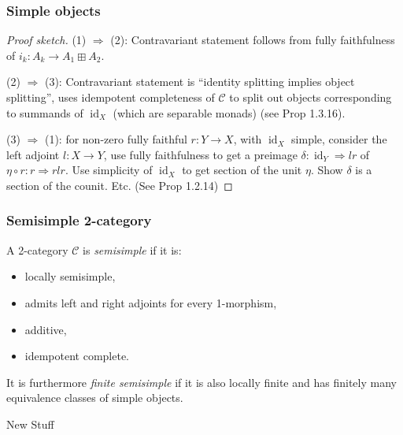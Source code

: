 \documentclass{beamer}
\DeclareMathOperator{\id}{id}
\newcommand{\cC}{{\mathcal{C}}}
\begin{document}
\begin{frame}
\frametitle{Simple objects}

\begin{proof}[Proof sketch]
(1) $\Rightarrow$ (2): Contravariant statement
follows from fully faithfulness of
$i_k: A_k \to A_1 \boxplus A_2$.

\pause

(2) $\Rightarrow$ (3): Contravariant statement is
``identity splitting implies object splitting'',
uses idempotent completeness of $\cC$
to split out objects corresponding to summands of $\id_X$
(which are separable monads)
(see \cite{DRfusion}{Prop 1.3.16}).

\pause

(3) $\Rightarrow$ (1): for non-zero fully faithful $r: Y \to X$,
with $\id_X$ simple,
consider the left adjoint $l: X \to Y$,
use fully faithfulness to get a preimage
$\delta : \id_Y \Rightarrow lr$ of
$\eta \circ r: r \Rightarrow rlr$.
Use simplicity of $\id_X$ to get section of the unit $\eta$.
Show $\delta$ is a section of the counit. Etc.
(See \cite{DRfusion}{Prop 1.2.14})
\end{proof}

\end{frame}

\begin{frame}
\frametitle{Semisimple 2-category}

\begin{definition}

\pause

A 2-category $\cC$ is \emph{semisimple}
if it is:
\begin{itemize}
\item locally semisimple,
\item admits left and right adjoints for every 1-morphism,
\item additive,
\item idempotent complete.
\end{itemize}

It is furthermore \emph{finite semisimple}
if it is also locally finite and
has finitely many equivalence classes of simple objects.
\end{definition}

\end{frame}


\begin{frame}

\begin{center}
\Huge New Stuff
\end{center}

\end{frame}
\end{document}
